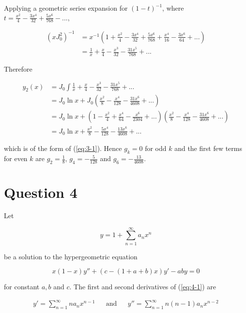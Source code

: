 \documentclass{article}
\begin{document}
Applying a geometric series expansion for $(1 - t)^{-1}$, where
$t = \frac{x^2}{4} - \frac{3x^4}{32} + \frac{5x^6}{768} - ...$,

\begin{align*}
    (xJ_0^2)^{-1} &= x^{-1}\left(1 + \frac{x^2}{4} - \frac{3x^4}{32} + \frac{5x^6}{768}
        + \frac{x^4}{16} - \frac{3x^6}{64} + ...\right)\\
    &= \frac{1}{x} + \frac{x}{4} - \frac{x^3}{32} - \frac{31x^5}{768} + ...
\end{align*}

Therefore

\begin{align*}
    y_2(x) &= J_0 \int \frac{1}{x} + \frac{x}{4} - \frac{x^3}{32} - \frac{31x^5}{768} + ...\\
    &= J_0\ln x + J_0\left(\frac{x^2}{8} - \frac{x^4}{128} - \frac{31x^6}{4608} + ...\right)\\
    &= J_0\ln x + \left(1 - \frac{x^2}{4} + \frac{x^4}{64} - \frac{x^6}{2304} + ...\right)
    \left(\frac{x^2}{8} - \frac{x^4}{128} - \frac{31x^6}{4608} + ...\right)\\
    &= J_0\ln x + \frac{x^2}{8} - \frac{5x^4}{128} - \frac{13x^6}{4608} + ...
\end{align*}

which is of the form of (\ref{eq:3-1}). Hence $g_k = 0$ for odd $k$ and the first few terms
for even $k$ are $g_2 = \frac{1}{8}$, $g_4 = -\frac{5}{128}$ and $g_6 = -\frac{13}{4608}$.

\section*{Question 4}

Let

\begin{equation} \label{eq:4-1}
    y = 1 + \sum_{n = 1}^\infty a_nx^n
\end{equation}

be a solution to the hypergeometric equation

\begin{equation} \label{eq:4-2}
    x(1 - x)y'' + (c - (1 + a + b)x)y' - aby = 0
\end{equation}

for constant $a, b$ and $c$. The first and second derivatives of (\ref{eq:4-1}) are

\begin{align*}
    y' = \sum_{n = 1}^\infty na_nx^{n - 1} && \text{and} && y'' = \sum_{n = 1}^\infty n(n - 1)a_nx^{n - 2}
\end{align*}
\end{document}
